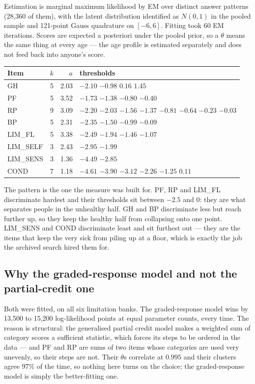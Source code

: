 \documentclass[11pt]{article}
\begin{document}
Estimation is marginal maximum likelihood by EM over distinct answer patterns
(28,360 of them), with the latent distribution identified as $N(0,1)$ in the
pooled sample and 121-point Gauss quadrature on $[-6,6]$. Fitting took 60 EM
iterations. Scores are expected a posteriori under the pooled prior, so a
$\theta$ means the same thing at every age --- the age profile is estimated
separately and does not feed back into anyone's score.

\begin{center}\small
\begin{tabular}{lrrl}
\toprule
Item & $k$ & $a$ & thresholds \\
\midrule
GH & 5 & 2.03 & $-2.10$\; $-0.98$\; $0.16$\; $1.45$ \\
PF & 5 & 3.52 & $-1.73$\; $-1.38$\; $-0.80$\; $-0.40$ \\
RP & 9 & 3.09 & $-2.20$\; $-2.03$\; $-1.56$\; $-1.37$\; $-0.81$\; $-0.64$\; $-0.23$\; $-0.03$ \\
BP & 5 & 2.31 & $-2.35$\; $-1.50$\; $-0.99$\; $-0.09$ \\
LIM\_FL & 5 & 3.38 & $-2.49$\; $-1.94$\; $-1.46$\; $-1.07$ \\
LIM\_SELF & 3 & 2.43 & $-2.95$\; $-1.99$ \\
LIM\_SENS & 3 & 1.36 & $-4.49$\; $-2.85$ \\
COND & 7 & 1.18 & $-4.61$\; $-3.90$\; $-3.12$\; $-2.26$\; $-1.25$\; $0.11$ \\
\bottomrule
\end{tabular}
\end{center}

The pattern is the one the measure was built for. PF, RP and LIM\_FL
discriminate hardest and their thresholds sit between $-2.5$ and $0$: they are
what separates people in the unhealthy half. GH and BP discriminate less but
reach further up, so they keep the healthy half from collapsing onto one point.
LIM\_SENS and COND discriminate least and sit furthest out --- they are the
items that keep the very sick from piling up at a floor, which is exactly the
job the archived search hired them for.

\subsection{Why the graded-response model and not the partial-credit one}

Both were fitted, on all six limitation banks. The graded-response model wins
by 13,500 to 15,200 log-likelihood points at equal parameter counts, every
time. The reason is structural: the generalised partial credit model makes a
weighted sum of category scores a sufficient statistic, which forces its steps
to be ordered in the data --- and PF and RP are sums of two items whose
categories are used very unevenly, so their steps are not. Their $\theta$s
correlate at $0.995$ and their clusters agree 97\% of the time, so nothing here
turns on the choice; the graded-response model is simply the better-fitting one.
\end{document}
